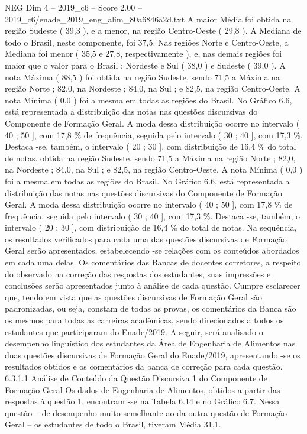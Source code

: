 \begin{textsample}{NEG Dim 4 – 2019\_c6 – Score 2.00 – 2019\_c6/enade\_2019\_eng\_alim\_80a6846a2d.txt}
A maior Média foi obtida na região Sudeste ( 39,3 ), e a menor, na região Centro-Oeste ( 29,8 ).
A Mediana de todo o Brasil, neste componente, foi 37,5.
Nas regiões Norte e Centro-Oeste, a Mediana foi menor ( 35,5 e 27,8, respectivamente ), e, nas demais regiões foi maior que o valor para o Brasil : Nordeste e Sul ( 38,0 ) e Sudeste ( 39,0 ).
A nota Máxima ( 88,5 ) foi obtida na região Sudeste, sendo 71,5 a Máxima na região Norte ; 82,0, na Nordeste ; 84,0, na Sul ; e 82,5, na região Centro-Oeste.
A nota Mínima ( 0,0 ) foi a mesma em todas as regiões do Brasil.
No Gráfico 6.6, está representada a distribuição das notas nas questões discursivas do Componente de Formação Geral.
A moda dessa distribuição ocorre no intervalo ( 40 ; 50 ], com 17,8 \% de frequência, seguida pelo intervalo ( 30 ; 40 ], com 17,3 \%.
Destaca -se, também, o intervalo ( 20 ; 30 ], com distribuição de 16,4 \% do total de notas. obtida na região Sudeste, sendo 71,5 a Máxima na região Norte ; 82,0, na Nordeste ; 84,0, na Sul ; e 82,5, na região Centro-Oeste.
A nota Mínima ( 0,0 ) foi a mesma em todas as regiões do Brasil.
No Gráfico 6.6, está representada a distribuição das notas nas questões discursivas do Componente de Formação Geral.
A moda dessa distribuição ocorre no intervalo ( 40 ; 50 ], com 17,8 \% de frequência, seguida pelo intervalo ( 30 ; 40 ], com 17,3 \%.
Destaca -se, também, o intervalo ( 20 ; 30 ], com distribuição de 16,4 \% do total de notas.
Na sequência, os resultados verificados para cada uma das questões discursivas de Formação Geral serão apresentados, estabelecendo -se relações com os conteúdos abordados em cada uma delas.
Os comentários das Bancas de docentes corretores, a respeito do observado na correção das respostas dos estudantes, suas impressões e conclusões serão apresentados junto à análise de cada questão.
Cumpre esclarecer que, tendo em vista que as questões discursivas de Formação Geral são padronizadas, ou seja, constam de todas as provas, os comentários da Banca são os mesmos para todas as carreiras acadêmicas, sendo direcionados a todos os estudantes que participaram do Enade/2019.
A seguir, será analisado o desempenho linguístico dos estudantes da Área de Engenharia de Alimentos nas duas questões discursivas de Formação Geral do Enade/2019, apresentando -se os resultados obtidos e os comentários da banca de correção para cada questão. 6.3.1.1 Análise de Conteúdo da Questão Discursiva 1 do Componente de Formação Geral Os dados de Engenharia de Alimentos, obtidos a partir das respostas à questão 1, encontram -se na Tabela 6.14 e no Gráfico 6.7.
Nessa questão – de desempenho muito semelhante ao da outra questão de Formação Geral – os estudantes de todo o Brasil, tiveram Média 31,1.

\end{textsample}
